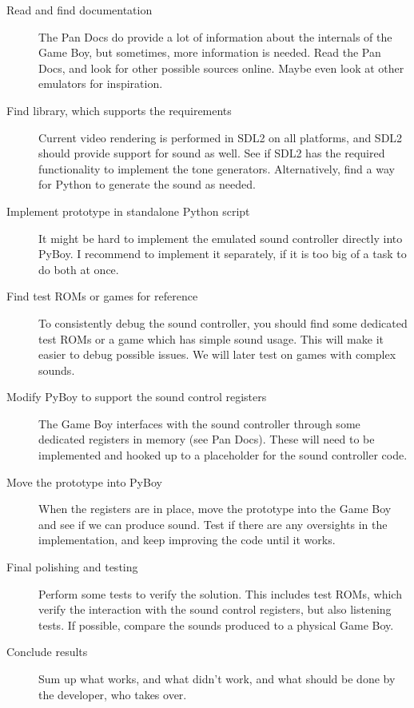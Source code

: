\documentclass[11pt]{report} %
\begin{document}
\begin{description}
    \item [Read and find documentation]
        The Pan Docs do provide a lot of information about the internals of the Game Boy, but sometimes, more information is needed. Read the Pan Docs, and look for other possible sources online. Maybe even look at other emulators for inspiration.

    \item [Find library, which supports the requirements]
        Current video rendering is performed in SDL2 on all platforms, and SDL2 should provide support for sound as well. See if SDL2 has the required functionality to implement the tone generators. Alternatively, find a way for Python to generate the sound as needed.

    \item [Implement prototype in standalone Python script]
        It might be hard to implement the emulated sound controller directly into PyBoy. I recommend to implement it separately, if it is too big of a task to do both at once.

    \item [Find test ROMs or games for reference]
        To consistently debug the sound controller, you should find some dedicated test ROMs or a game which has simple sound usage. This will make it easier to debug possible issues. We will later test on games with complex sounds.

    \item [Modify PyBoy to support the sound control registers]
        The Game Boy interfaces with the sound controller through some dedicated registers in memory (see Pan Docs). These will need to be implemented and hooked up to a placeholder for the sound controller code.

    \item [Move the prototype into PyBoy]
        When the registers are in place, move the prototype into the Game Boy and see if we can produce sound. Test if there are any oversights in the implementation, and keep improving the code until it works.

    \item [Final polishing and testing]
        Perform some tests to verify the solution. This includes test ROMs, which verify the interaction with the sound control registers, but also listening tests. If possible, compare the sounds produced to a physical Game Boy.

    \item [Conclude results]
        Sum up what works, and what didn't work, and what should be done by the developer, who takes over.

\end{description}
\end{document}
